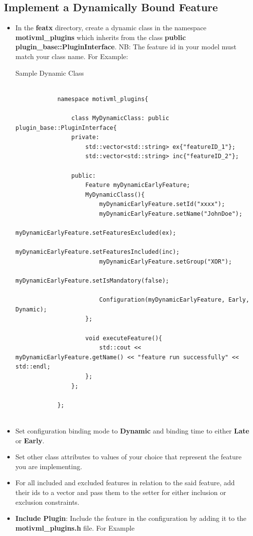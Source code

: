 \documentclass{article}
\newenvironment{longlisting}{\captionsetup{type=listing}}{}
\begin{document}
\subsection{Implement a Dynamically Bound Feature}
\begin{itemize}
	\item In the \textbf{featx} directory, create a dynamic class in the namespace \textbf{motivml\_plugins} which inherits from the class \textbf{public plugin\_base::PluginInterface}. NB: The feature id in your model must match your class name. For Example:
	
	\begin{longlisting}
		\caption{Sample Dynamic Class}
		\begin{verbatim}
			
			namespace motivml_plugins{
				
				class MyDynamicClass: public plugin_base::PluginInterface{
				private:
					std::vector<std::string> ex{"featureID_1"};
					std::vector<std::string> inc{"featureID_2"};
					
				public:
					Feature myDynamicEarlyFeature;
					MyDynamicClass(){
						myDynamicEarlyFeature.setId("xxxx");
						myDynamicEarlyFeature.setName("JohnDoe");
						myDynamicEarlyFeature.setFeaturesExcluded(ex);
						myDynamicEarlyFeature.setFeaturesIncluded(inc);
						myDynamicEarlyFeature.setGroup("XOR");
						myDynamicEarlyFeature.setIsMandatory(false);
						
						Configuration(myDynamicEarlyFeature, Early, Dynamic);
					};
					
					void executeFeature(){
						std::cout << myDynamicEarlyFeature.getName() << "feature run successfully" << std::endl;
					};
				};
				
			};
			
		\end{verbatim}
		\label{samplestaticlate}
	\end{longlisting}

	\item Set configuration binding mode to \textbf{Dynamic} and binding time to either \textbf{Late} or \textbf{Early}.
	\item Set other class attributes to values of your choice that represent the feature you are implementing.
	\item For all included and excluded features in relation to the said feature, add their ids to a vector and pass them to the setter for either inclusion or exclusion constraints.
	\item \textbf{Include Plugin}: Include the feature in the configuration by adding it to the \textbf{motivml\_plugins.h} file. For Example
	

\end{itemize}
\end{document}
